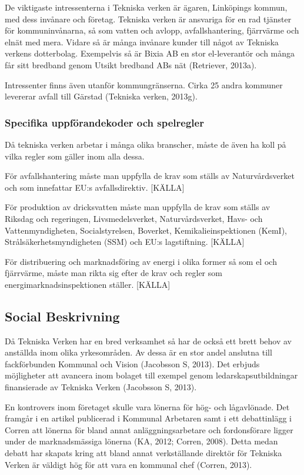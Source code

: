 \documentclass[10pt,a4paper]{article}
\begin{document}
De viktigaste intressenterna i Tekniska verken är ägaren, Linköpings kommun,
med dess invånare och företag. Tekniska verken är ansvariga för en rad tjänster
för kommuninvånarna, så som vatten och avlopp, avfallshantering, fjärrvärme och
elnät med mera. Vidare så är många invånare kunder till något av Tekniska
verkens dotterbolag. Exempelvis så är Bixia AB en stor el-leverantör och många
får sitt bredband genom Utsikt bredband ABs nät (Retriever, 2013a). 

Intressenter finns även utanför kommungränserna. Cirka 25 andra kommuner
levererar avfall till Gärstad (Tekniska verken, 2013g).

\subsubsection{Specifika uppförandekoder och spelregler} 
Då tekniska verken arbetar i många olika branscher, måste de även ha koll på
vilka regler som gäller inom alla dessa.

För avfallshantering måste man uppfylla de krav som ställs av Naturvårdsverket och
som innefattar EU:s avfallsdirektiv. [KÄLLA]

För produktion av dricksvatten måste man uppfylla de krav som ställs av Riksdag
och regeringen, Livsmedelsverket, Naturvårdsverket, Havs- och Vattenmyndigheten,
Socialstyrelsen, Boverket, Kemikalieinspektionen (KemI), Strålsäkerhetsmyndigheten 
(SSM) och EU:s lagstiftning. [KÄLLA]

För distribuering och marknadsföring av energi i olika former så som el och
fjärrvärme, måste man rikta sig efter de krav och regler som
energimarknadsinspektionen ställer. [KÄLLA]

\subsection{Social Beskrivning}
Då Tekniska Verken har en bred verksamhet så har de också ett brett
behov av anställda inom olika yrkesområden. Av dessa är en stor andel
anslutna till fackförbunden Kommunal och Vision (Jacobsson S,
2013). Det erbjuds möjligheter att avancera inom bolaget till exempel
genom ledarskapsutbildningar finansierade av Tekniska Verken
(Jacobsson S, 2013). 

En kontrovers inom företaget skulle vara lönerna för hög- och
lågavlönade. Det framgår i en artikel publicerad i Kommunal Arbetaren samt i ett
debattinlägg i Corren att lönerna för bland annat anläggningsarbetare
och fordonsförare ligger under de marknadsmässiga lönerna (KA, 2012;
Corren, 2008). Detta medan debatt har skapats kring att bland annat
verkställande direktör för Tekniska Verken är väldigt hög för att vara
en kommunal chef (Corren, 2013).
\end{document}
